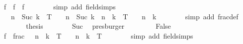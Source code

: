 \begin{isabellebody}
\ {\isachardoublequoteopen}{\isacharquery}{\kern0pt}f{\isacharprime}{\kern0pt}\ {\isacharequal}{\kern0pt}\ {\isacharquery}{\kern0pt}f\ {\isacharplus}{\kern0pt}\ {\isacharquery}{\kern0pt}f{\isachardoublequoteclose}\isanewline
\ \ \ \ \ \ \isamarkupfalse%
\ {\isacharparenleft}{\kern0pt}simp\ add{\isacharcolon}{\kern0pt}\ field{\isacharunderscore}{\kern0pt}simps{\isacharparenright}{\kern0pt}\isanewline
\ \ \ \ \isamarkupfalse%
\ \isamarkupfalse%
\ {\isachardoublequoteopen}{\isasymlfloor}{}\ {\isacharcircum}{\kern0pt}\ {\isacharparenleft}{\kern0pt}n\ {\isacharplus}{\kern0pt}\ Suc\ k{\isacharparenright}{\kern0pt}\ {\isacharasterisk}{\kern0pt}\ T{\isasymrfloor}\ {\isacharslash}{\kern0pt}\ {}\ {\isacharcircum}{\kern0pt}\ {\isacharparenleft}{\kern0pt}n\ {\isacharplus}{\kern0pt}\ Suc\ k{\isacharparenright}{\kern0pt}\ {\isacharequal}{\kern0pt}\ {\isasymlfloor}{}{\isacharcircum}{\kern0pt}{\isacharparenleft}{\kern0pt}n\ {\isacharplus}{\kern0pt}\ k{\isacharparenright}{\kern0pt}\ {\isacharasterisk}{\kern0pt}\ T{\isasymrfloor}\ {\isacharslash}{\kern0pt}\ {}\ {\isacharcircum}{\kern0pt}\ {\isacharparenleft}{\kern0pt}n\ {\isacharplus}{\kern0pt}\ k{\isacharparenright}{\kern0pt}{\isachardoublequoteclose}\isanewline
\ \ \ \ \ \ \isamarkupfalse%
\ {\isacharparenleft}{\kern0pt}simp\ add{\isacharcolon}{\kern0pt}\ frac{\isacharunderscore}{\kern0pt}def{\isacharparenright}{\kern0pt}\isanewline
\ \ \ \ \isamarkupfalse%
\ \isamarkupfalse%
\ {\isacharquery}{\kern0pt}thesis\isanewline
\ \ \ \ \ \ \isamarkupfalse%
\ Suc\ \isamarkupfalse%
\ presburger\isanewline
\ \ \isamarkupfalse%
\isanewline
\ \ \ \ \isamarkupfalse%
\ False\isanewline
\ \ \ \ \isamarkupfalse%
\ {\isachardoublequoteopen}{\isacharquery}{\kern0pt}f{\isacharprime}{\kern0pt}\ {\isacharequal}{\kern0pt}\ frac\ {\isacharparenleft}{\kern0pt}{}\ {\isacharcircum}{\kern0pt}\ {\isacharparenleft}{\kern0pt}n\ {\isacharplus}{\kern0pt}\ k{\isacharparenright}{\kern0pt}\ {\isacharasterisk}{\kern0pt}\ T\ {\isacharplus}{\kern0pt}\ {}\ {\isacharcircum}{\kern0pt}\ {\isacharparenleft}{\kern0pt}n\ {\isacharplus}{\kern0pt}\ k{\isacharparenright}{\kern0pt}\ {\isacharasterisk}{\kern0pt}\ T{\isacharparenright}{\kern0pt}{\isachardoublequoteclose}\isanewline
\ \ \ \ \ \ \isamarkupfalse%
\ {\isacharparenleft}{\kern0pt}simp\ add{\isacharcolon}{\kern0pt}\ field{\isacharunderscore}{\kern0pt}simps{\isacharparenright}{\kern0pt}\isanewline

\end{isabellebody}
